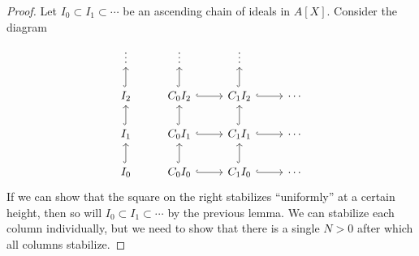 \documentclass[12pt]{article}
\begin{document}
\begin{proof}
	Let $I_0\subset I_1\subset\cdots$ be an ascending chain of ideals in $A[X]$. Consider the diagram 
	\begin{equation*}
\begin{tikzcd}
\vdots              & \vdots                                 & \vdots                                 &        \\
I_2 \arrow[u, hook] & C_0I_2 \arrow[u, hook] \arrow[r, hook] & C_1I_2 \arrow[u, hook] \arrow[r, hook] & \cdots \\
I_1 \arrow[u, hook] & C_0I_1 \arrow[u, hook] \arrow[r, hook] & C_1I_1 \arrow[r, hook] \arrow[u, hook] & \cdots \\
I_0 \arrow[u, hook] & C_0I_0 \arrow[u, hook] \arrow[r, hook] & C_1I_0 \arrow[r, hook] \arrow[u, hook] & \cdots
\end{tikzcd}
	\end{equation*}
	If we can show that the square on the right stabilizes ``uniformly'' at a certain height, then so will $I_0\subset I_1\subset\cdots$ by the previous lemma. We can stabilize each column individually, but we need to show that there is a single $N>0$ after which all columns stabilize.


\end{proof}
\end{document}
